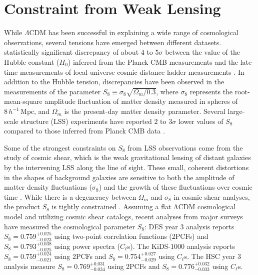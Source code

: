 \section{Constraint from Weak Lensing}
While $\Lambda$CDM has been successful in explaining a wide range of cosmological observations, several tensions have emerged between different datasets. statistically significant discrepancy of about $4$ to $5\sigma$ between the value of the Hubble constant ($H_0$) inferred from the Planck CMB measurements \citep{2021CQGra..38o3001D} and the late-time measurements of local universe cosmic distance ladder measurements \citep{2022ApJ...934L...7R}. In addition to the Hubble tension, discrepancies have been observed in the measurements of the parameter $S_8 \equiv \sigma_8 \sqrt{\Omega_m/0.3}$, where $\sigma_8$ represents the root-mean-square amplitude fluctuation of matter density measured in spheres of $8\, h^{-1}\,\mathrm{Mpc}$, and $\Omega_m$ is the present-day matter density parameter. Several large-scale structure (LSS) experiments have reported $2$ to $3\sigma$ lower values of $S_8$ compared to those inferred from Planck CMB data \citep{2019PASJ...71...43H, 2021A&A...645A.104A, 2021JCAP...10..030G}.

Some of the strongest constraints on $S_8$ from LSS observations come from the study of cosmic shear, which is the weak gravitational lensing of distant galaxies by the intervening LSS along the line of sight. 
These small, coherent distortions in the shapes of background galaxies are sensitive to both the amplitude of matter density fluctuations ($\sigma_8$) and the growth of these fluctuations over cosmic time \citep{2001PhR...340..291B, 2010CQGra..27w3001B, 2015RPPh...78h6901K}. While there is a degeneracy between $\Omega_m$ and $\sigma_8$ in cosmic shear analyses, the product $S_8$ is tightly constrained \citep{2015RPPh...78h6901K, 2018ARA&A..56..393M}. Assuming a flat ΛCDM cosmological model and utilizing cosmic shear catalogs, recent analyses from major surveys have measured the cosmological parameter $S_8$: DES year 3 analysis reports $S_8 = 0.759^{+0.025}_{-0.023}$ \citep{2022PhRvD.105b3514A, PhysRevD.105.023515} using two-point correlation functions (2PCFs) and $S_8 = 0.793^{+0.038}_{-0.025}$ \citep{2022MNRAS.515.1942D} using power spectra ($C_\ell$s). The KiDS-1000 analysis reports $S_8 = 0.759^{+0.024}_{-0.021}$ \citep{2021A&A...645A.104A} using 2PCFs and $S_8 = 0.754^{+0.027}_{-0.029}$ \citep{2022A&A...665A..56L} using $C_\ell$s. The HSC year 3 analysis measure $S_8 = 0.769^{+0.031}_{-0.034}$ \citep{2023PhRvD.108l3518L} using 2PCFs and $S_8 = 0.776^{+0.032}_{-0.033}$ \citep{2023PhRvD.108l3519D} using $C_\ell$s.

